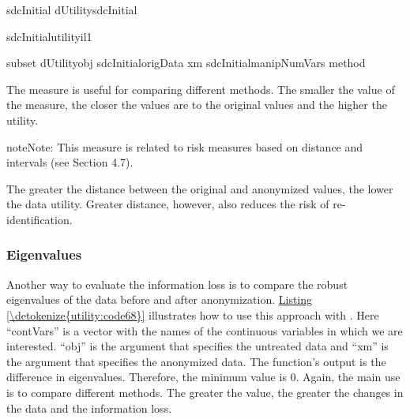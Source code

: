 \documentclass[letterpaper,10pt,english]{sphinxmanual}
\begin{document}
\def\sphinxLiteralBlockLabel{\label{\detokenize{utility:code67}}}
%
\begin{sphinxVerbatim}[commandchars=\\\{\},numbers=left,firstnumber=1,stepnumber=1]
sdcInitial  dUtilitysdcInitial

sdcInitialutilityil1

subset  \PYGZbs{}   
dUtilityobj  sdcInitialorigData\PYG{p}{[}\PYG{p}{]} xm  sdcInitialmanipNumVars\PYG{p}{[}\PYG{p}{]}
method  
\end{sphinxVerbatim}

The measure is useful for comparing different methods. The smaller the
value of the measure, the closer the values are to the original values
and the higher the utility.

\begin{sphinxadmonition}{note}{Note:}
This measure is related to risk measures based on distance and intervals (see Section 4.7).
\end{sphinxadmonition}

The greater the distance between the original and anonymized values, the
lower the data utility. Greater distance, however, also reduces the risk
of re-identification.


\subsubsection{Eigenvalues}
\label{\detokenize{utility:eigenvalues}}
Another way to evaluate the information loss is to compare the robust
eigenvalues of the data before and after anonymization. \hyperref[\detokenize{utility:code68}]{Listing \ref{\detokenize{utility:code68}}}
illustrates how to use this approach with . Here “contVars” is
a vector with the names of the continuous variables in which we are
interested. “obj” is the argument that specifies the untreated data and
“xm” is the argument that specifies the anonymized data. The function’s
output is the difference in eigenvalues. Therefore, the minimum value is
0. Again, the main use is to compare different methods. The greater the
value, the greater the changes in the data and the information loss.
\end{document}
